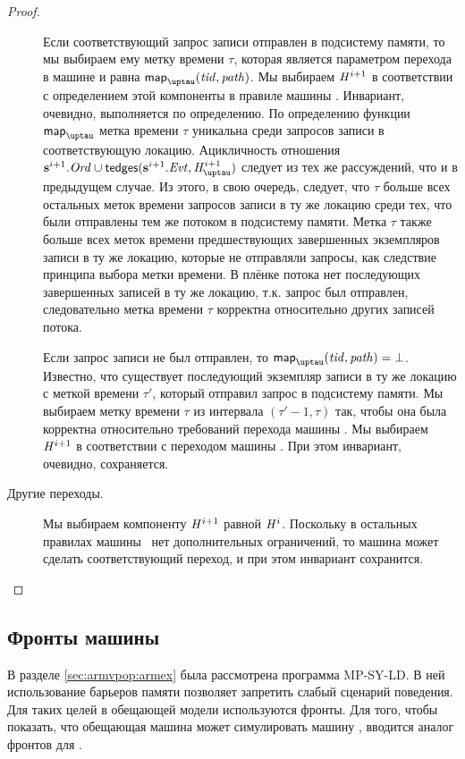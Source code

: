 \begin{proof}
\begin{description}
    Если соответствующий запрос записи отправлен в подсистему памяти, то мы выбираем
    ему метку времени $\tau$, которая является параметром перехода в машине \ARMt и
    равна $\taumapping(\tId, \cpath)$.
    Мы выбираем $\mathit{H}^{i + 1}$ в соответствии с определением этой компоненты в
    правиле  машины \ARMt.
    Инвариант, очевидно, выполняется по определению.
    По определению функции $\taumapping$ метка времени $\tau$ уникальна среди запросов записи
    в соответствующую локацию.
    Ацикличность отношения $\s^{i+1}.\Ord \cup \moTau(\s^{i+1}.\Evt, \tmap^{i + 1})$
    следует из тех же рассуждений, что и в предыдущем случае.
    Из этого, в свою очередь, следует, что $\tau$ больше всех остальных меток времени
    запросов записи в ту же локацию среди тех, что были отправлены тем же потоком
    в подсистему памяти.
    Метка $\tau$ также больше всех меток времени предшествующих завершенных
    экземпляров записи в ту же локацию, которые не отправляли запросы,
    как следствие принципа выбора метки времени.
    В плёнке потока нет последующих завершенных записей в ту же локацию,
    т.к. запрос был отправлен, следовательно метка времени $\tau$ корректна относительно
    других записей потока.
    
    Если запрос записи не был отправлен, то $\taumapping(\tId, \cpath) = \bot$.
    Известно, что существует последующий экземпляр записи в ту же локацию с меткой
    времени $\tau'$, который отправил запрос в подсистему памяти.
    Мы выбираем метку времени $\tau$ из интервала $(\tau' - 1, \tau)$ так, чтобы
    она была корректна относительно требований перехода машины \ARMt.
    Мы выбираем $\mathit{H}^{i + 1}$ в соответствии с переходом
     машины \ARMt.
    При этом инвариант, очевидно, сохраняется.

  \item[Другие переходы.]
    Мы выбираем компоненту $\mathit{H}^{i + 1}$ равной $\mathit{H}^{i}$.
    Поскольку в остальных правилах машины \ARMt~нет дополнительных ограничений,
    то машина может сделать соответствующий переход, и при этом инвариант сохранится.
    \qedhere
  \end{description}
\end{proof}

\subsection{Фронты машины \ARMt}
В разделе \ref{sec:armvpop:armex} была рассмотрена программа \textrm{MP-SY-LD}.
В ней использование барьеров памяти позволяет запретить слабый сценарий поведения.
Для таких целей в обещающей модели используются фронты.
Для того, чтобы показать, что обещающая машина может симулировать машину \ARMt,
вводится аналог фронтов для \ARMt.

